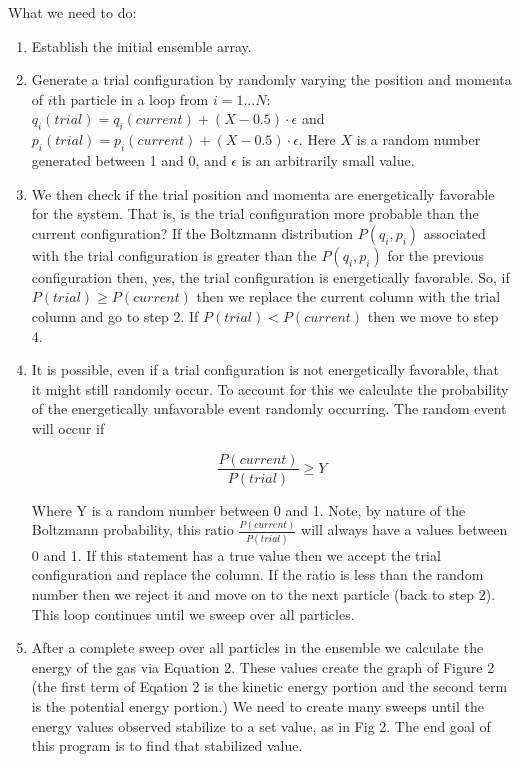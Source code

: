 \documentclass[11pt]{amsart}
\begin{document}
What we need to do:
\begin{enumerate}
\item Establish the initial ensemble array.
\item Generate a trial configuration by randomly varying the position and momenta of $i$th particle in a loop from $i=1...N$: $q_i(trial)=q_i(current)+(X-0.5) \cdot \epsilon$ and $p_i(trial)=p_i(current)+(X-0.5) \cdot \epsilon$.  Here $X$ is a random number generated between 1 and 0, and $\epsilon$ is an arbitrarily small value.

\item We then check if the trial position and momenta are energetically favorable for the system.  That is, is the trial configuration more probable than the current configuration?  If the Boltzmann distribution $P(q_i,p_i)$ associated with the trial configuration is greater than the $P(q_i,p_i)$ for the previous configuration then, yes, the trial configuration is energetically favorable.  So, if $P(trial) \geq P(current)$ then we replace the current column with the trial column and go to step 2.  If $P(trial) < P(current)$ then we move to step 4.

\item It is possible, even if a trial configuration is not energetically favorable, that it might still randomly occur.  To account for this we calculate the probability of the energetically unfavorable event randomly occurring. The random event will occur if 

 \[
 \frac {P(current)}{P(trial)} \geq Y
\]

Where Y is a random number between 0 and 1.  Note, by nature of the Boltzmann probability, this ratio $ \frac {P(current)}{P(trial)}$ will always have a values between 0 and 1.  If this statement has a true value then we accept the trial configuration and replace the column.  If the ratio is less than the random number then we reject it and move on to the next particle (back to step 2).  This loop continues until we sweep over all particles.

\item After a complete sweep over all particles in the ensemble we calculate the energy of the gas via Equation 2.  These values create the graph of Figure 2 (the first term of Eqation 2 is the kinetic energy portion and the second term is the potential energy portion.)  We need to create many sweeps until the energy values observed stabilize to a set value, as in Fig 2.  The end goal of this program is to find that stabilized value.

\end{enumerate}
\vspace{5 mm}
\end{document}
